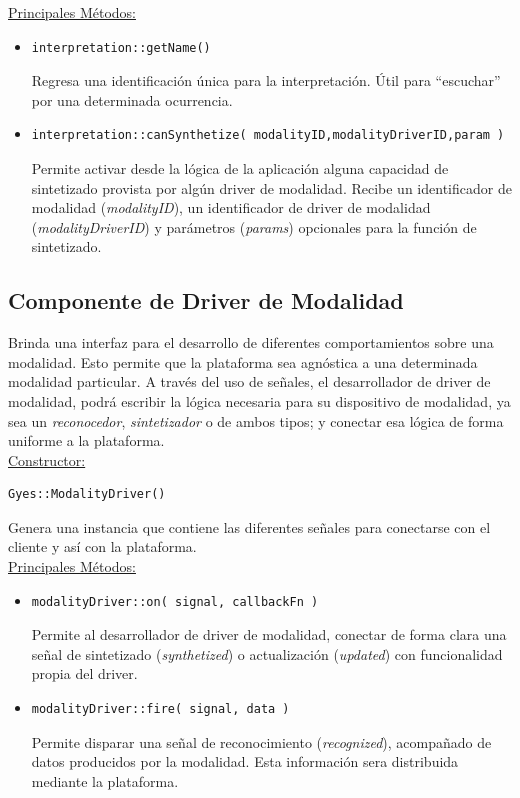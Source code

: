 \underline{\textsf{Principales Métodos:}}\\
\begin{itemize}
\item[]
\begin{lstlisting}
interpretation::getName()
\end{lstlisting}
Regresa una identificación única para la interpretación. Útil para ``escuchar'' por una determinada ocurrencia.

\item[]
\begin{lstlisting}
interpretation::canSynthetize( modalityID,modalityDriverID,param )
\end{lstlisting}
Permite activar desde la lógica de la aplicación alguna capacidad de sintetizado provista por algún driver de modalidad. Recibe un identificador de modalidad (\emph{modalityID}), un identificador de driver de modalidad (\emph{modalityDriverID}) y parámetros (\emph{params}) opcionales para la función de sintetizado.

\end{itemize}

\subsection{Componente de Driver de Modalidad}

Brinda una interfaz para el desarrollo de diferentes comportamientos sobre una modalidad. Esto permite que la plataforma sea agnóstica a una determinada modalidad particular. A través del uso de señales, el desarrollador de driver de modalidad, podrá escribir la lógica necesaria para su dispositivo de modalidad, ya sea un \emph{reconocedor}, \emph{sintetizador} o de ambos tipos; y conectar esa lógica de forma uniforme a la plataforma.
\\

\underline{\textsf{Constructor:}}\\
\begin{lstlisting}
Gyes::ModalityDriver()
\end{lstlisting}
Genera una instancia que contiene las diferentes señales para conectarse con el cliente y así con la plataforma.
\\

\underline{\textsf{Principales Métodos:}}\\
\begin{itemize}
\item[]
\begin{lstlisting}
modalityDriver::on( signal, callbackFn )
\end{lstlisting}
Permite al desarrollador de driver de modalidad, conectar de forma clara una señal de sintetizado (\emph{synthetized}) o actualización (\emph{updated}) con funcionalidad propia del driver.
\item[]
\begin{lstlisting}
modalityDriver::fire( signal, data )
\end{lstlisting}
Permite disparar una señal de reconocimiento (\emph{recognized}), acompañado de datos producidos por la modalidad. Esta información sera distribuida mediante la plataforma.
\end{itemize}

